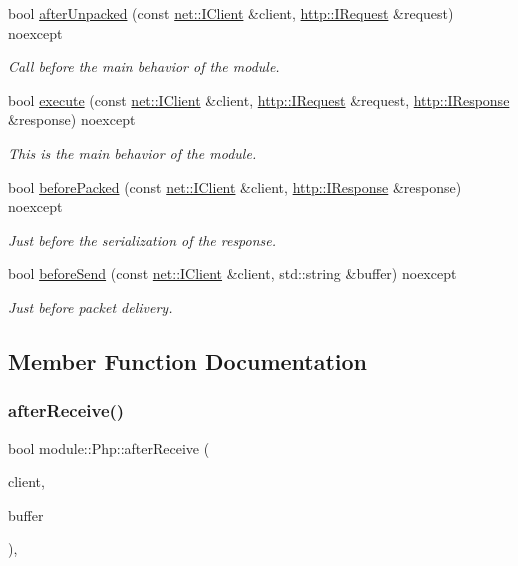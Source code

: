 \begin{DoxyCompactItemize}
bool \hyperlink{classmodule_1_1Php_ae3f23ea75718c51e0427fa2d13ab9755}{after\+Unpacked} (const \hyperlink{structnet_1_1IClient}{net\+::\+I\+Client} \&client, \hyperlink{structhttp_1_1IRequest}{http\+::\+I\+Request} \&request) noexcept
\begin{DoxyCompactList}\small\item\em Call before the main behavior of the module. \end{DoxyCompactList}\item 
bool \hyperlink{classmodule_1_1Php_aa73bfe086a0015a892f7d5687639aafb}{execute} (const \hyperlink{structnet_1_1IClient}{net\+::\+I\+Client} \&client, \hyperlink{structhttp_1_1IRequest}{http\+::\+I\+Request} \&request, \hyperlink{structhttp_1_1IResponse}{http\+::\+I\+Response} \&response) noexcept
\begin{DoxyCompactList}\small\item\em This is the main behavior of the module. \end{DoxyCompactList}\item 
bool \hyperlink{classmodule_1_1Php_a71b22ae01eedfd3406d01907cd7dc3d9}{before\+Packed} (const \hyperlink{structnet_1_1IClient}{net\+::\+I\+Client} \&client, \hyperlink{structhttp_1_1IResponse}{http\+::\+I\+Response} \&response) noexcept
\begin{DoxyCompactList}\small\item\em Just before the serialization of the response. \end{DoxyCompactList}\item 
bool \hyperlink{classmodule_1_1Php_a9ba9768f149e9dbf3094d5cdb4967fc3}{before\+Send} (const \hyperlink{structnet_1_1IClient}{net\+::\+I\+Client} \&client, std\+::string \&buffer) noexcept
\begin{DoxyCompactList}\small\item\em Just before packet delivery. \end{DoxyCompactList}\end{DoxyCompactItemize}


\subsection{Member Function Documentation}
\mbox{\label{classmodule_1_1Php_a553dd60d283baf309a9ba8ddb87681b8}} 
\subsubsection{\texorpdfstring{after\+Receive()}{afterReceive()}}
{\footnotesize\ttfamily bool module\+::\+Php\+::after\+Receive (\begin{DoxyParamCaption}\item[{const \hyperlink{structnet_1_1IClient}{net\+::\+I\+Client} \&}]{client,  }\item[{std\+::string \&}]{buffer }\end{DoxyParamCaption})\hspace{0.3cm}{\ttfamily [virtual]}, {\ttfamily [noexcept]}}



